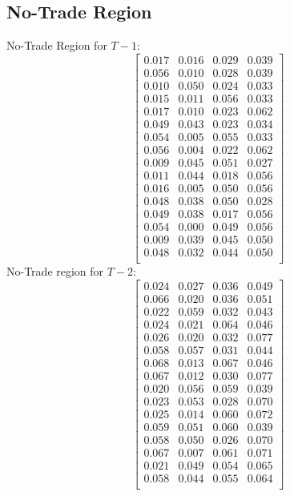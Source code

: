\documentclass[11pt]{article}
\begin{document}
\begin{appendices}
\section{No-Trade Region }\label{section: 4dNTR}
No-Trade Region for $T-1$:
\[
\begin{bmatrix}
0.017 & 0.016 & 0.029 & 0.039 \\
0.056 & 0.010 & 0.028 & 0.039 \\
0.010 & 0.050 & 0.024 & 0.033 \\
0.015 & 0.011 & 0.056 & 0.033 \\
0.017 & 0.010 & 0.023 & 0.062 \\
0.049 & 0.043 & 0.023 & 0.034 \\
0.054 & 0.005 & 0.055 & 0.033 \\
0.056 & 0.004 & 0.022 & 0.062 \\
0.009 & 0.045 & 0.051 & 0.027 \\
0.011 & 0.044 & 0.018 & 0.056 \\
0.016 & 0.005 & 0.050 & 0.056 \\
0.048 & 0.038 & 0.050 & 0.028 \\
0.049 & 0.038 & 0.017 & 0.056 \\
0.054 & 0.000 & 0.049 & 0.056 \\
0.009 & 0.039 & 0.045 & 0.050 \\
0.048 & 0.032 & 0.044 & 0.050 \\
\end{bmatrix}
\]
No-Trade region for $T-2$:
\[
\begin{bmatrix}
0.024 & 0.027 & 0.036 & 0.049 \\
0.066 & 0.020 & 0.036 & 0.051 \\
0.022 & 0.059 & 0.032 & 0.043 \\
0.024 & 0.021 & 0.064 & 0.046 \\
0.026 & 0.020 & 0.032 & 0.077 \\
0.058 & 0.057 & 0.031 & 0.044 \\
0.068 & 0.013 & 0.067 & 0.046 \\
0.067 & 0.012 & 0.030 & 0.077 \\
0.020 & 0.056 & 0.059 & 0.039 \\
0.023 & 0.053 & 0.028 & 0.070 \\
0.025 & 0.014 & 0.060 & 0.072 \\
0.059 & 0.051 & 0.060 & 0.039 \\
0.058 & 0.050 & 0.026 & 0.070 \\
0.067 & 0.007 & 0.061 & 0.071 \\
0.021 & 0.049 & 0.054 & 0.065 \\
0.058 & 0.044 & 0.055 & 0.064 \\
\end{bmatrix}
\]


\end{appendices}
\end{document}
